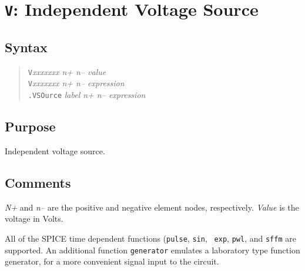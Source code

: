 %
%
%
%
\section{{\tt V}: Independent Voltage Source}
\subsection{Syntax}
\begin{verse}
{\tt V}{\it xxxxxxx n+ n-- value}\\
{\tt V}{\it xxxxxxx n+ n-- expression}\\
{\tt .VSOurce} {\it label n+ n-- expression}
\end{verse}
\subsection{Purpose}

Independent voltage source.
\subsection{Comments}

{\it N+} and {\it n--} are the positive and negative element nodes,
respectively.  {\it Value} is the voltage in Volts.

All of the SPICE time dependent functions ({\tt pulse}, {\tt sin}, {\tt
exp}, {\tt pwl}, and {\tt sffm} are supported.  An additional
function {\tt generator} emulates a laboratory type function generator, for
a more convenient signal input to the circuit.
